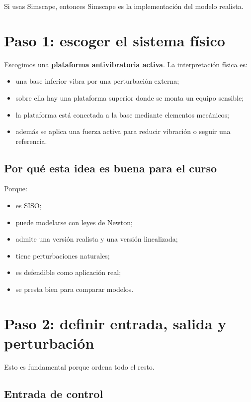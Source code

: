 \documentclass[11pt]{article}
\begin{document}
Si usas Simscape, entonces Simscape es la implementaci\'on del modelo realista.

\section{Paso 1: escoger el sistema f\'isico}

Escogimos una \textbf{plataforma antivibratoria activa}. La interpretaci\'on f\'isica es:

\begin{itemize}[leftmargin=1.2cm]
\item una base inferior vibra por una perturbaci\'on externa;
\item sobre ella hay una plataforma superior donde se monta un equipo sensible;
\item la plataforma est\'a conectada a la base mediante elementos mec\'anicos;
\item adem\'as se aplica una fuerza activa para reducir vibraci\'on o seguir una referencia.
\end{itemize}

\subsection{Por qu\'e esta idea es buena para el curso}

Porque:

\begin{itemize}[leftmargin=1.2cm]
\item es SISO;
\item puede modelarse con leyes de Newton;
\item admite una versi\'on realista y una versi\'on linealizada;
\item tiene perturbaciones naturales;
\item es defendible como aplicaci\'on real;
\item se presta bien para comparar modelos.
\end{itemize}

\section{Paso 2: definir entrada, salida y perturbaci\'on}

Esto es fundamental porque ordena todo el resto.

\subsection{Entrada de control}
\end{document}

